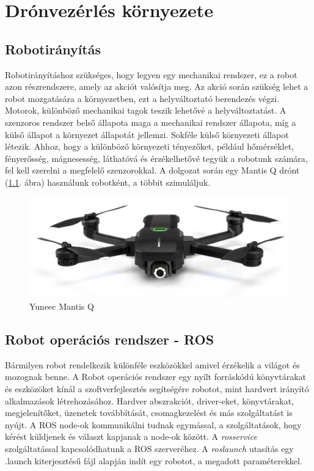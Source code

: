 \chapter{Drónvezérlés környezete}
\section{Robotirányítás}
Robotirányításhoz szükséges, hogy legyen egy mechanikai rendszer, ez a robot azon részrendszere, amely az akciót valósítja meg. Az akció során szükség lehet a robot mozgatására a környezetben,
ezt a helyváltoztató berendezés végzi. Motorok, különböző mechanikai tagok teszik lehetővé a helyváltoztatást. A szenzoros rendszer belső állapota maga a mechanikai rendszer állapota, míg a külső állapot a környezet állapotát jellemzi.
Sokféle külső környezeti állapot létezik. Ahhoz, hogy a különböző környezeti tényezőket, például hőmérséklet, fényerősség, mágnesesség, láthatóvá és érzékelhetővé tegyük a robotunk számára, fel kell szerelni a megfelelő szenzorokkal.
A dolgozat során egy Mantis Q drónt (\ref{fig:mantisq}. ábra) használunk robotként, a többit szimuláljuk.

\begin{figure}
	\centering
	\includegraphics[width=\linewidth]{figures/mantisq.jpg}
	\caption{Yuneec Mantis Q \cite{mantisq}}
	\label{fig:mantisq}
\end{figure}

\section{Robot operációs rendszer - ROS}
Bármilyen robot rendelkezik különféle eszközökkel amivel érzékelik a világot és mozognak benne. A Robot operációs rendszer egy nyílt forráskódú könyvtárakat és eszközöket kínál a szoftverfejlesztés segítségére robotot, mint hardvert irányító alkalmazások létrehozásához. Hardver abszrakciót, driver-eket, könyvtárakat, megjelenítőket, üzenetek továbbítását, csomagkezelést és más szolgáltatást is nyújt. \cite{roswiki}
A ROS node-ok kommunikálni tudnak egymással, a szolgáltatások, hogy kérést küldjenek és választ kapjanak a node-ok között. A \emph{rosservice} szolgáltatással kapcsolódhatunk a ROS szerveréhez.
A \emph{roslaunch} utasítás egy .launch kiterjesztésű fájl alapján indít egy robotot, a megadott paraméterekkel.

